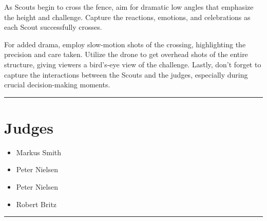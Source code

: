 \documentclass[10pt]{article}
\begin{document}
As Scouts begin to cross the fence, aim for dramatic low angles that emphasize the height and challenge. Capture the reactions, emotions, and celebrations as each Scout successfully crosses. 

For added drama, employ slow-motion shots of the crossing, highlighting the precision and care taken. Utilize the drone to get overhead shots of the entire structure, giving viewers a bird's-eye view of the challenge. Lastly, don't forget to capture the interactions between the Scouts and the judges, especially during crucial decision-making moments.


\vspace{0.5cm}
	\hrule
	\vspace{0.5cm}
		\section*{\faUsers \: Judges}

		

	\begin{multicols}{2}

		\begin{itemize}
									\item Markus Smith
									\item Peter Nielsen
						\end{itemize}

		\vfill\null
		\columnbreak

		\begin{itemize}
									\item Peter Nielsen
									\item Robert Britz
						\end{itemize}

		\vfill\null

		\end{multicols}



			\vspace{0.5cm}
	\hrule
	\vspace{0.5cm}
\end{document}
